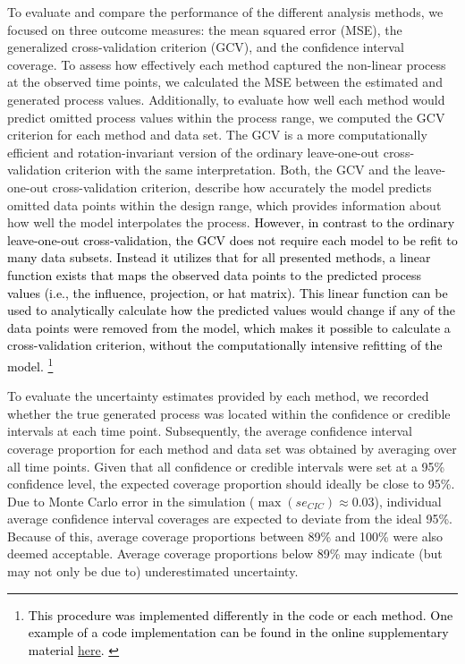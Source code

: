 \documentclass[man, floatsintext]{apa7}
\begin{document}
To evaluate and compare the performance of the different analysis methods, we
focused on three outcome measures: the mean squared error (MSE), the
generalized cross-validation criterion (GCV), and the confidence interval
coverage. To assess how effectively each method captured the non-linear process
at the observed time points, we calculated the MSE between the estimated and
generated process values. Additionally, to evaluate how well each method would
predict omitted process values within the process range, we computed the GCV
\parencite{golub_generalized_1979} criterion for each method and data set. The
GCV is a more computationally efficient and rotation-invariant version of the
ordinary leave-one-out cross-validation criterion with the same interpretation.
Both, the GCV and the leave-one-out cross-validation criterion, describe how
accurately the model predicts omitted data points within the design range,
which provides information about how well the model interpolates the process.
\textcolor{black}{However, in contrast to the ordinary leave-one-out
  cross-validation, the GCV does not require each model to be refit to many
  data
  subsets. Instead it utilizes that for all presented methods, a linear
  function
  exists that maps the observed data points to the predicted process values
  (i.e., the influence, projection, or hat matrix). This linear function can be
  used to analytically calculate how the predicted values would change if any
  of
  the data points were removed from the model, which makes it possible to
  calculate a cross-validation criterion, without the computationally intensive
  refitting of the model.}
\footnote{\textcolor{black}{This procedure was implemented differently
    in the code or each method. One example of a code implementation can
    be found in the online supplementary material
    \href{https://shorturl.at/Lhv9N}{here}.
  }}

To evaluate the uncertainty estimates provided by each method, we recorded
whether the true generated process was located within the confidence or
credible intervals at each time point. Subsequently, the average confidence
interval coverage proportion for each method and data set was obtained by
averaging over all time points. Given that all confidence or credible intervals
were set at a 95\% confidence level, the expected coverage proportion should
ideally be close to 95\%. Due to Monte Carlo error in the simulation
($\max(se_{CIC}) \approx 0.03$), individual average confidence interval
coverages are expected to deviate from the ideal 95\%. Because of this, average
coverage proportions between 89\% and 100\% were also deemed acceptable.
Average coverage proportions below 89\% may indicate (but may not only be due
to) underestimated uncertainty.
\end{document}
